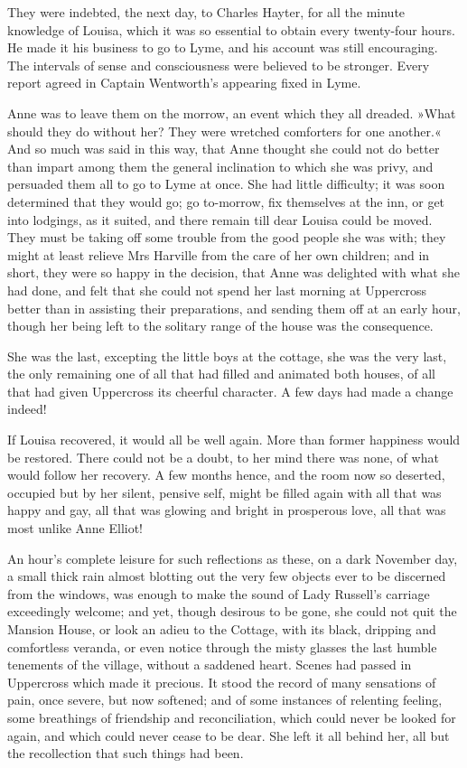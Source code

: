 They were indebted, the next day, to Charles Hayter, for all the minute knowledge of Louisa, which it was so essential to obtain every twenty-four hours. He made it his business to go to Lyme, and his account was still encouraging. The intervals of sense and consciousness were believed to be stronger. Every report agreed in Captain Wentworth's appearing fixed in Lyme.

Anne was to leave them on the morrow, an event which they all dreaded. »What should they do without her? They were wretched comforters for one another.« And so much was said in this way, that Anne thought she could not do better than impart among them the general inclination to which she was privy, and persuaded them all to go to Lyme at once. She had little difficulty; it was soon determined that they would go; go to-morrow, fix themselves at the inn, or get into lodgings, as it suited, and there remain till dear Louisa could be moved. They must be taking off some trouble from the good people she was with; they might at least relieve Mrs Harville from the care of her own children; and in short, they were so happy in the decision, that Anne was delighted with what she had done, and felt that she could not spend her last morning at Uppercross better than in assisting their preparations, and sending them off at an early hour, though her being left to the solitary range of the house was the consequence.

She was the last, excepting the little boys at the cottage, she was the very last, the only remaining one of all that had filled and animated both houses, of all that had given Uppercross its cheerful character. A few days had made a change indeed!

If Louisa recovered, it would all be well again. More than former happiness would be restored. There could not be a doubt, to her mind there was none, of what would follow her recovery. A few months hence, and the room now so deserted, occupied but by her silent, pensive self, might be filled again with all that was happy and gay, all that was glowing and bright in prosperous love, all that was most unlike Anne Elliot!

An hour's complete leisure for such reflections as these, on a dark November day, a small thick rain almost blotting out the very few objects ever to be discerned from the windows, was enough to make the sound of Lady Russell's carriage exceedingly welcome; and yet, though desirous to be gone, she could not quit the Mansion House, or look an adieu to the Cottage, with its black, dripping and comfortless veranda, or even notice through the misty glasses the last humble tenements of the village, without a saddened heart. Scenes had passed in Uppercross which made it precious. It stood the record of many sensations of pain, once severe, but now softened; and of some instances of relenting feeling, some breathings of friendship and reconciliation, which could never be looked for again, and which could never cease to be dear. She left it all behind her, all but the recollection that such things had been.

